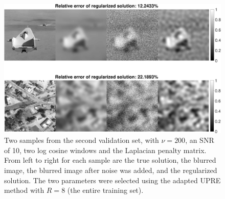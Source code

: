 \documentclass[12pt]{article}
\begin{document}
\begin{figure}[ht]
\centering
\includegraphics[width=1.0\textwidth]{Figures/Sample Solutions.pdf}
\caption{Two samples from the second validation set, with $\nu = 200$, an SNR of 10, two log cosine windows and the Laplacian penalty matrix. From left to right for each sample are the true solution, the blurred image, the blurred image after noise was added, and the regularized solution. The two parameters were selected using the adapted UPRE method with $R = 8$ (the entire training set).}
\label{fig:SampleSolutions_v200_SNR10_logCosine2_L}
\end{figure}
\end{document}
